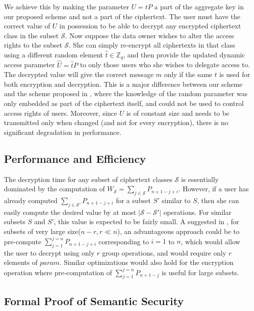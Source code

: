 We achieve this by making the parameter $U=tP$ a part of the aggregate key in our proposed scheme and not a part of the ciphertext. The user must have the correct value of $U$ in possession to be able to decrypt any encrypted ciphertext class in the subset $\mathcal{S}$. Now suppose the data owner wishes to alter the access rights to the subset $\mathcal{S}$. She can simply re-encrypt all ciphertexts in that class using a different random element $\hat{t}\in\mathbb{Z}_q$, and then provide the updated dynamic access parameter $\hat{U}=\hat{t}P$ to only those users who she wishes to delegate access to. The decrypted value will give the correct message $m$ only if the same $t$ is used for both encryption and decryption. This is a major difference between our scheme and the scheme proposed in \cite{chu2014key}, where the knowledge of the random parameter was only embedded as part of the ciphertext itself, and could not be used to control access rights of users. Moreover, since $U$ is of constant size and needs to be transmitted only when changed (and not for every encryption), there is no significant degradation in performance.

\subsection{Performance and Efficiency}
\label{subsec:perf}
The decryption time for any subset of ciphertext classes $\mathcal{S}$ is essentially dominated by the computation of $W_{\mathcal{S}}=\sum_{j\in\mathcal{S}}P_{n+1-j+i}$. However, if a user has already computed $\sum_{j\in\mathcal{S}'}P_{n+1-j+i}$ for a subset $S'$ similar to $S$, then she can easily compute the desired value by at most $|\mathcal{S}-\mathcal{S}'|$ operations. For similar subsets $S$ and $S'$, this value is expected to be fairly small. A suggested in \cite{boneh2005collusion}, for subsets of very large size($n-r, r\ll n$), an advantageous approach could be to pre-compute $\sum_{j=1}^{j=n}P_{n+1-j+i}$ corresponding to $i=1$ to $n$, which would allow the user to decrypt using only $r$ group operations, and would require only $r$ elements of $param$. Similar optimizations would also hold for the encryption operation where pre-computation of  $\sum_{j=1}^{j=n}P_{n+1-j}$ is useful for large subsets.

\subsection{Formal Proof of Semantic Security}
\label{subsec:proof_basic}


